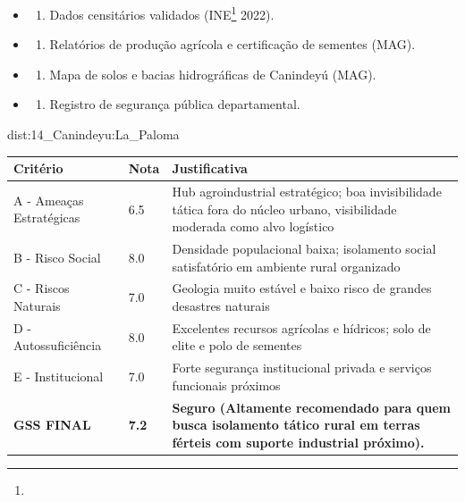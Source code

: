 {\begin{itemize}
\tightlist
\item
  \begin{enumerate}
  \def\labelenumi{\arabic{enumi})}
  \tightlist
  \item
    Dados censitários validados (INE\footnote{\fineINE} 2022).
  \end{enumerate}
\item
  \begin{enumerate}
  \def\labelenumi{\arabic{enumi})}
  \setcounter{enumi}{1}
  \tightlist
  \item
    Relatórios de produção agrícola e certificação de sementes (MAG).
  \end{enumerate}
\item
  \begin{enumerate}
  \def\labelenumi{\arabic{enumi})}
  \setcounter{enumi}{2}
  \tightlist
  \item
    Mapa de solos e bacias hidrográficas de Canindeyú (MAG).
  \end{enumerate}
\item
  \begin{enumerate}
  \def\labelenumi{\arabic{enumi})}
  \setcounter{enumi}{3}
  \tightlist
  \item
    Registro de segurança pública departamental.
  \end{enumerate}
\end{itemize}}{dist:14_Canindeyu:La_Paloma}
\begin{table}[ht!]
\small \begin{tabular}{p{3.0cm}p{0.8cm}p{6.0cm}} \toprule
\textbf{Critério} & \textbf{Nota} & \textbf{Justificativa} \\ \midrule
A - Ameaças Estratégicas & 6.5 & Hub agroindustrial estratégico; boa invisibilidade tática fora do núcleo urbano, visibilidade moderada como alvo logístico \\
B - Risco Social & 8.0 & Densidade populacional baixa; isolamento social satisfatório em ambiente rural organizado \\
C - Riscos Naturais & 7.0 & Geologia muito estável e baixo risco de grandes desastres naturais \\
D - Autossuficiência & 8.0 & Excelentes recursos agrícolas e hídricos; solo de elite e polo de sementes \\
E - Institucional & 7.0 & Forte segurança institucional privada e serviços funcionais próximos \\
\midrule \textbf{GSS FINAL} & \textbf{7.2} & \textbf{Seguro (Altamente recomendado para quem busca isolamento tático rural em terras férteis com suporte industrial próximo).} \\ \bottomrule \end{tabular}
\end{table}
